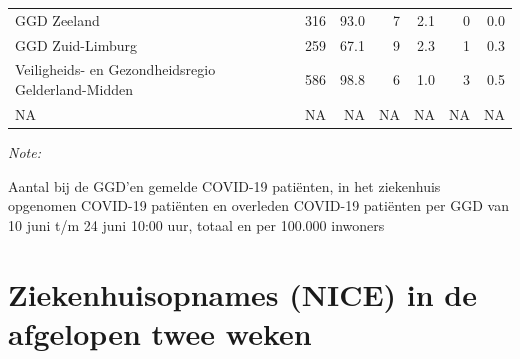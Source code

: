 \documentclass[
  english,
  man,floatsintext]{apa6}
\begin{document}
\begin{table}
\begin{threeparttable}
\begin{tabular}{lrrrrrr}
GGD Zeeland & 316 & 93.0 & 7 & 2.1 & 0 & 0.0\\
GGD Zuid-Limburg & 259 & 67.1 & 9 & 2.3 & 1 & 0.3\\
Veiligheids- en Gezondheidsregio Gelderland-Midden & 586 & 98.8 & 6 & 1.0 & 3 & 0.5\\
NA & NA & NA & NA & NA & NA & NA\\
\bottomrule
\end{tabular}
\begin{tablenotes}
\item \textit{Note: } 
\item Aantal bij de GGD’en gemelde COVID-19 patiënten, in het ziekenhuis opgenomen COVID-19 patiënten en overleden COVID-19 patiënten per GGD van 10 juni t/m 24 juni 10:00 uur, totaal en per 100.000 inwoners
\end{tablenotes}
\end{threeparttable}
\endgroup{}
\end{table}

\newpage

\hypertarget{ziekenhuisopnames-nice-in-de-afgelopen-twee-weken}{%
\section{Ziekenhuisopnames (NICE) in de afgelopen twee weken}\label{ziekenhuisopnames-nice-in-de-afgelopen-twee-weken}}
\end{document}
